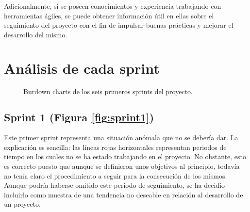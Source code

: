 Adicionalmente, si se poseen conocimientos y experiencia trabajando con herramientas ágiles, se puede obtener información útil en ellas sobre el seguimiento del proyecto con el fin de impulsar buenas prácticas y mejorar el desarrollo del mismo.

\section{Análisis de cada sprint}

\begin{figure}[H]
\centering
{}\qquad
{}\qquad
{}\qquad
{}\qquad
{}\qquad
{}
\caption{Burdown charts de los seis primeros sprints del proyecto.}
\label{fig:sprints1-6}
\end{figure}

\subsection{Sprint 1 (Figura \ref{fig:sprint1})}

Este primer sprint representa una situación anómala que no se debería dar. La explicación es sencilla: las líneas rojas horizontales representan periodos de tiempo en los cuales no se ha estado trabajando en el proyecto. No obstante, esto es correcto puesto que aunque se definieron unos objetivos al principio, todavía no tenía claro el procedimiento a seguir para la consecución de los mismos. Aunque podría haberse omitido este periodo de seguimiento, se ha decidio incluirlo como muestra de una tendencia no deseable en relación al desarrollo de un proyecto.

